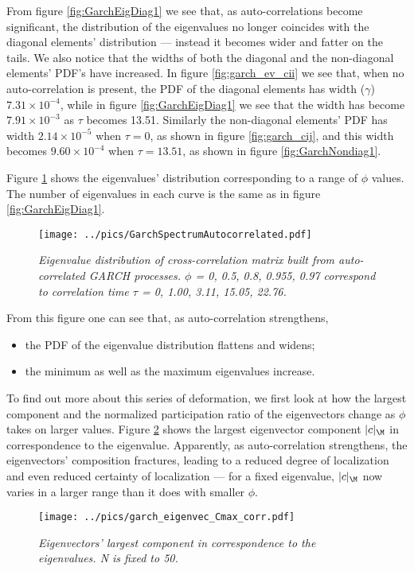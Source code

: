 From figure \ref{fig:GarchEigDiag1} we see that, as auto-correlations
become significant, the distribution of the eigenvalues no longer
coincides with the diagonal elements' distribution --- instead it
becomes wider and fatter on the tails. We also notice that the widths
of both the diagonal and the non-diagonal elements' PDF's have
increased.  In figure \ref{fig:garch_ev_cii} we see that, when no
auto-correlation is present, the PDF of the diagonal elements has
width ($\gamma$) $7.31 \times 10^{-4}$, while in figure
\ref{fig:GarchEigDiag1} we see that the width has become $7.91 \times
10^{-3}$ as $\tau$ becomes 13.51. Similarly the non-diagonal elements'
PDF has width $2.14 \times 10^{-5}$ when $\tau=0$, as shown in figure
\ref{fig:garch_cij}, and this width becomes $9.60 \times 10^{-4}$ when
$\tau = 13.51$, as shown in figure \ref{fig:GarchNondiag1}.

Figure \ref{fig:GarchSpectrumAutocorrelated} shows the eigenvalues'
distribution corresponding to a range of $\phi$ values. The number of
eigenvalues in each curve is the same as in figure
\ref{fig:GarchEigDiag1}.
\begin{figure}[htb!]
  \centering
  \texttt{[image: ../pics/GarchSpectrumAutocorrelated.pdf]}
  \caption{\small \it Eigenvalue distribution of cross-correlation
    matrix built from auto-correlated GARCH processes. $\phi$ = 0,
    0.5, 0.8, 0.955, 0.97 correspond to correlation time $\tau$ =
    0, 1.00, 3.11, 15.05, 22.76.}
  \label{fig:GarchSpectrumAutocorrelated}
\end{figure}
From this figure one can see that, as auto-correlation strengthens,
\begin{itemize}
\item the PDF of the eigenvalue distribution flattens and widens;
\item the minimum as well as the maximum eigenvalues increase.
\end{itemize}

To find out more about this series of deformation, we first look at
how the largest component and the normalized participation ratio of
the eigenvectors change as $\phi$ takes on larger values. Figure
\ref{fig:garch_eigenvec_Cmax_corr} shows the largest eigenvector
component $|c|_\M$ in correspondence to the eigenvalue. Apparently, as
auto-correlation strengthens, the eigenvectors' composition
fractures, leading to a reduced degree of localization and even
reduced certainty of localization --- for a fixed eigenvalue, $|c|_\M$
now varies in a larger range than it does with smaller $\phi$.
\begin{figure}[htb!]
  \centering
  \texttt{[image: ../pics/garch\_eigenvec\_Cmax\_corr.pdf]}
  \caption{\small \it Eigenvectors' largest component in
    correspondence to the eigenvalues. N is fixed to 50.}
  \label{fig:garch_eigenvec_Cmax_corr}
\end{figure}


